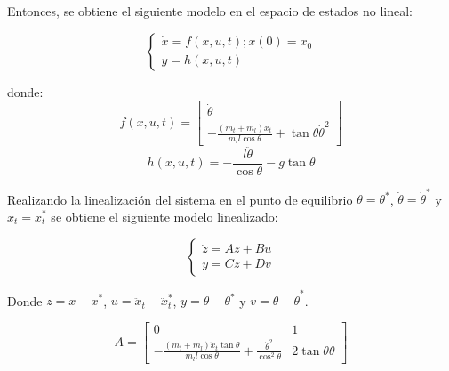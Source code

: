 \documentclass{article}
\begin{document}
            Entonces, se obtiene el siguiente modelo en el espacio de estados no lineal:

            \begin{equation}
                \begin{cases}
                    \dot{x} = f(x,u,t) ; x(0) = x_0 \\
                    y = h(x,u,t)
                \end{cases}
            \end{equation}

            donde:
            \begin{equation}
                f(x,u,t) = \begin{bmatrix}
                    \dot{\theta} \\
                    - \frac{(m_t+m_l)\ddot{x}_t}{m_l l \cos{\theta}} + \tan{\theta} \dot{\theta}^2
                \end{bmatrix}
            \end{equation}
            \begin{equation}
                h(x,u,t) = -\frac{l \ddot{\theta}}{\cos{\theta}}  - g \tan{\theta}
            \end{equation}

            Realizando la linealización del sistema en el punto de equilibrio \(\theta = \theta^*\), \(\dot{\theta} = \dot{\theta}^*\) y \(\ddot{x}_t = \ddot{x}_t^*\) se obtiene el siguiente modelo linealizado:

            \begin{equation}
                \begin{cases}
                    \dot{z} = Az + Bu \\
                    y = Cz + Dv
                \end{cases}
            \end{equation}

            Donde \(z = x - x^*\), \(u = \ddot{x}_t - \ddot{x}_t^*\), \(y = \theta - \theta^*\) y \(v = \dot{\theta} - \dot{\theta}^*\).

            \begin{equation}
                A = \begin{bmatrix}
                    0 & 1 \\
                    -\frac{(m_t+m_l)\ddot{x}_t\tan{\theta}}{m_l l \cos{\theta}} + \frac{\dot{\theta}^2}{\cos^2{\theta}} & 2 \tan{\theta} \dot{\theta}
                \end{bmatrix}
            \end{equation}
\end{document}
